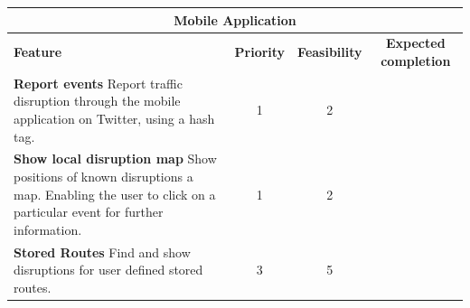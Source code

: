 \begin{center}
\begin{tabular}{ | p{8cm} | c | c | c | }
\hline
\multicolumn{4}{|c|}{\textbf{Mobile Application}} \\ \hline
\textbf{Feature} & \textbf{Priority} & \textbf{Feasibility} & \textbf{Expected completion} \\ \hline
\textbf{Report events}\newline
Report traffic disruption through the mobile application on Twitter, using a hash tag. & 1 & 2 & \\ \hline
\textbf{Show local disruption map}\newline
Show positions of known disruptions a map. Enabling the user to click on a particular event for further information. & 1 & 2 & \\ \hline
\textbf{Stored Routes}\newline
Find and show disruptions for user defined stored routes. & 3 & 5 & \\ \hline
\end{tabular}
\end{center}